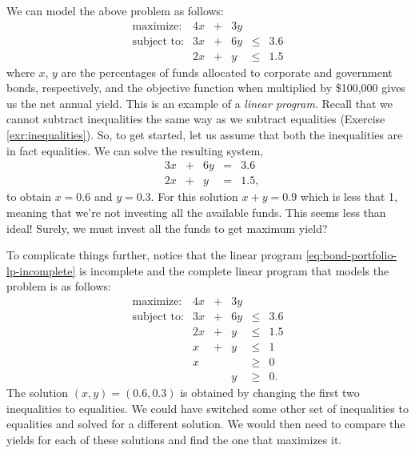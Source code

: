 \documentclass[
]{book}
\theoremstyle{definition}
\theoremstyle{definition}
\theoremstyle{definition}
\theoremstyle{definition}
\theoremstyle{remark}
\begin{document}
We can model the above problem as follows:
\begin{equation}
  \begin{array}{rrrrrr}
  \mbox{maximize:} & 4x & + & 3y \\
  \mbox{subject to:}
    & 3x & + & 6y & \le & 3.6 \\
    & 2x & + & y & \le & 1.5 
  \end{array}
  \label{eq:bond-portfolio-lp-incomplete}
\end{equation}
where \(x\), \(y\) are the percentages of funds allocated to corporate and government bonds, respectively, and the objective function when multiplied by \$100,000 gives us the net annual yield. This is an example of a \emph{linear program}.
Recall that we cannot subtract inequalities the same way as we subtract equalities (Exercise \ref{exr:inequalities}). So, to get started, let us assume that both the inequalities are in fact equalities. We can solve the resulting system,
\begin{equation*}
  \begin{array}{rrrrrl}
    & 3x & + & 6y & = & 3.6 \\
    & 2x & + & y & = & 1.5,
  \end{array}
\end{equation*}
to obtain \(x = 0.6\) and \(y = 0.3\). For this solution \(x + y = 0.9\) which is less that 1, meaning that we're not investing all the available funds. This seems less than ideal! Surely, we must invest all the funds to get maximum yield?

To complicate things further, notice that the linear program \eqref{eq:bond-portfolio-lp-incomplete} is incomplete and the complete linear program that models the problem is as follows:
\begin{equation}
  \begin{array}{rrrrrl}
  \mbox{maximize:} & 4x & + & 3y \\
  \mbox{subject to:}
    & 3x & + & 6y & \le & 3.6 \\
    & 2x & + & y & \le & 1.5 \\
    & x & + & y & \le & 1 \\
    & x &  &  & \ge & 0 \\
    &   &  & y & \ge & 0.
  \end{array}
  \label{eq:bond-portfolio-lp}
\end{equation}
The solution \((x, y) = (0.6, 0.3)\) is obtained by changing the first two inequalities to equalities. We could have switched some other set of inequalities to equalities and solved for a different solution. We would then need to compare the yields for each of these solutions and find the one that maximizes it.
\end{document}
